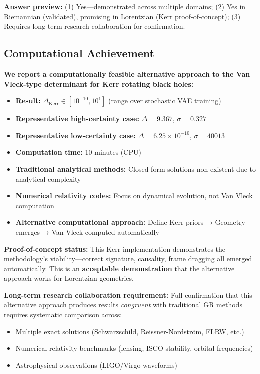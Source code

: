 \documentclass[11pt,a4paper]{article}
\begin{document}
\textbf{Answer preview:} (1) Yes—demonstrated across multiple domains; (2) Yes in Riemannian (validated), promising in Lorentzian (Kerr proof-of-concept); (3) Requires long-term research collaboration for confirmation.

\subsection{Computational Achievement}

\textbf{We report a computationally feasible alternative approach to the Van Vleck-type determinant for Kerr rotating black holes:}

\begin{itemize}
\item \textbf{Result:} $\Delta_{\text{Kerr}} \in [10^{-10}, 10^{1}]$ (range over stochastic VAE training)
\item \textbf{Representative high-certainty case:} $\Delta = 9.367$, $\sigma = 0.327$
\item \textbf{Representative low-certainty case:} $\Delta = 6.25 \times 10^{-10}$, $\sigma = 40013$
\item \textbf{Computation time:} 10 minutes (CPU)
\item \textbf{Traditional analytical methods:} Closed-form solutions non-existent due to analytical complexity
\item \textbf{Numerical relativity codes:} Focus on dynamical evolution, not Van Vleck computation
\item \textbf{Alternative computational approach:} Define Kerr priors → Geometry emerges → Van Vleck computed automatically
\end{itemize}

\textbf{Proof-of-concept status:} This Kerr implementation demonstrates the methodology's viability—correct signature, causality, frame dragging all emerged automatically. This is an \textbf{acceptable demonstration} that the alternative approach works for Lorentzian geometries.

\textbf{Long-term research collaboration requirement:} Full confirmation that this alternative approach produces results \emph{congruent} with traditional GR methods requires systematic comparison across:
\begin{itemize}
\item Multiple exact solutions (Schwarzschild, Reissner-Nordström, FLRW, etc.)
\item Numerical relativity benchmarks (lensing, ISCO stability, orbital frequencies)
\item Astrophysical observations (LIGO/Virgo waveforms)
\end{itemize}
\end{document}
